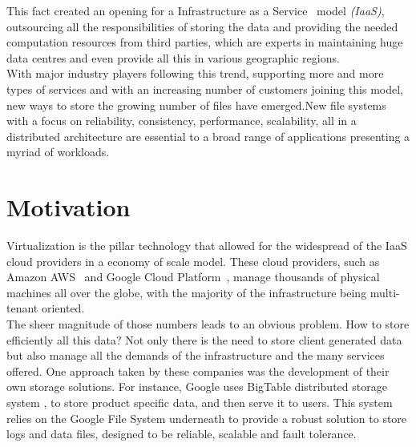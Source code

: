 This fact created an opening for a Infrastructure as a Service~\cite{Mell2011} model \textit{(IaaS)}, outsourcing all the responsibilities of storing the data and providing the needed computation resources from third parties, which are experts in maintaining huge data centres and even provide all this in various geographic regions.
\\
%

With major industry players following this trend, supporting more and more types of services and with an increasing number of customers joining this model, new ways to store the growing number of files have emerged.New file systems with a focus on reliability, consistency, performance, scalability, all in a distributed architecture are essential to a broad range of applications presenting a myriad of workloads.



\section{Motivation} %
\label{sec:motivation}

Virtualization is the pillar technology that allowed for the widespread of the IaaS cloud providers in a economy of scale model. These cloud providers, such as Amazon AWS~\cite{aws_2017} and Google Cloud Platform~\cite{gcp_2017}, manage thousands of physical machines all over the globe, with the majority of the infrastructure being multi-tenant oriented. 
\\
%
The sheer magnitude of those numbers leads to an obvious problem. How to store efficiently all this data? 
Not only there is the need to store client generated data but also manage all the demands of the infrastructure and the many services offered. 
One approach taken by these companies was the development of their own storage solutions. For instance, Google uses BigTable distributed storage system \cite{Chang2006}, to store product specific data, and then serve it to users. This system relies on the Google File System underneath to provide a robust solution to store logs and data files, designed to be reliable, scalable and fault tolerance.
\\
%

